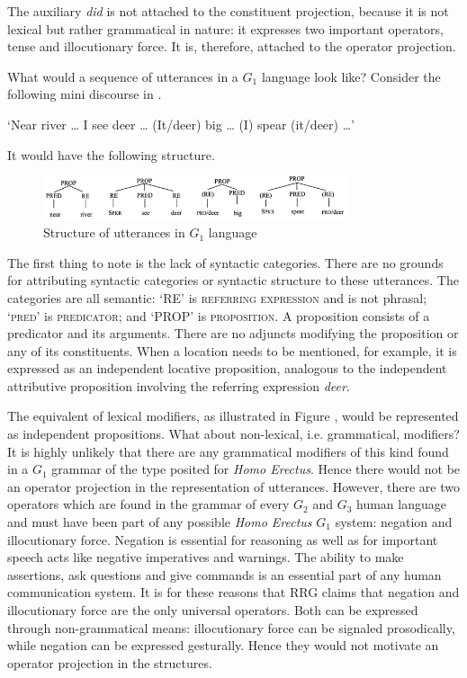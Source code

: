 \documentclass[output=paper,colorlinks,citecolor=brown]{langscibook}
\begin{document}
The auxiliary \emph{did} is not attached to the constituent projection, because it is not lexical but  rather grammatical in nature: it expresses two important operators, tense and illocutionary force.  It is, therefore, attached to the operator projection.

What would a sequence of utterances in a $G_1$ language look like?  Consider the following mini discourse in .

\ea \label{vanvalin_example_3}
‘Near river \ldots{}  I see deer \ldots{}  (It/deer) big \ldots{}  (I) spear (it/deer) \ldots ’\z

It would have the following structure.
\begin{figure}
\centering
\includegraphics[width=0.8\textwidth]{vanvalin_figure2.png}
\caption{\label{fig:fig2}Structure of utterances in $G_1$ language}
\end{figure}

The first thing to note is the lack of syntactic categories.  There are no grounds for attributing syntactic categories or syntactic structure to these utterances.  The categories are all semantic: ‘RE’ is \textsc{referring expression} and is not phrasal; ‘\textsc{pred}’ is \textsc{predicator}; and ‘PROP’ is \textsc{proposition}.  A proposition consists of a predicator and its arguments. There are no adjuncts modifying the proposition or any of its constituents.  When a location needs to be mentioned, for example, it is expressed as an independent locative proposition, analogous to the independent attributive proposition involving the referring expression \emph{deer}.  

The equivalent of lexical modifiers, as illustrated in Figure , would be represented as independent propositions.  What about non-lexical, i.e. grammatical, modifiers?  It is highly unlikely that there are any grammatical modifiers of this kind found in a $G_1$ grammar of the type posited for \emph{Homo Erectus}.  Hence there would not be an operator projection in the representation of utterances.  However, there are two operators which are found in the grammar of every $G_2$ and $G_3$ human language and must have been part of any possible \emph{Homo Erectus} $G_1$ system: negation and illocutionary force. Negation is essential for reasoning as well as for important speech acts like negative imperatives and warnings.  The ability to make assertions, ask questions and give commands is an essential part of any human communication system.  It is for these reasons that RRG claims that negation and illocutionary force are the only universal operators.  Both can be expressed through non-grammatical means: illocutionary force can be signaled prosodically, while negation can be expressed gesturally.  Hence they would not motivate an operator projection in the structures.
\end{document}
